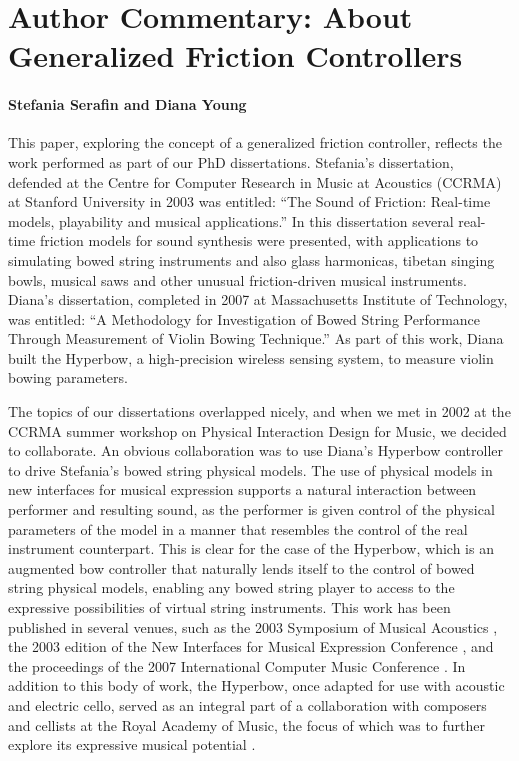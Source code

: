 \section*{Author Commentary: About Generalized Friction Controllers}

\paragraph{Stefania Serafin and Diana Young}

This paper, exploring the concept of a generalized friction controller, reflects the work performed as part of our PhD dissertations. Stefania's dissertation, defended at the Centre for Computer Research in Music at Acoustics (CCRMA) at Stanford University in 2003 was entitled: ``The Sound of Friction: Real-time models, playability and musical applications.''  In this dissertation several real-time friction models for sound synthesis were presented, with applications to simulating bowed string instruments and also glass harmonicas, tibetan singing bowls, musical saws and other unusual friction-driven musical instruments. Diana's dissertation, completed in 2007 at Massachusetts Institute of Technology, was entitled: ``A Methodology for Investigation of Bowed String Performance Through Measurement of Violin Bowing Technique.'' As part of this work, Diana built the Hyperbow, a high-precision wireless sensing system, to measure violin bowing parameters.

The topics of our dissertations overlapped nicely, and when we met in 2002 at the CCRMA summer workshop on Physical Interaction Design for Music, we decided to collaborate. An obvious collaboration was to use Diana's Hyperbow controller to drive Stefania's bowed string physical models. The use of physical models in new interfaces for musical expression supports a natural interaction between performer and resulting sound, as the performer is given control of the physical parameters of the model in a manner that resembles the control of the real instrument counterpart. This is clear for the case of the Hyperbow, which is an augmented bow controller that naturally lends itself to the control of bowed string physical models, enabling any bowed string player to access to the expressive possibilities of virtual string instruments. This work has been published in several venues, such as the 2003 Symposium of Musical Acoustics \cite{Serafin:2003}, the 2003 edition of the New Interfaces for Musical Expression Conference \cite{Young:2003b}, and  the proceedings of the 2007 International Computer Music Conference \cite{Young:2007}. In addition to this body of work, the Hyperbow, once adapted for use with acoustic and electric cello, served as an integral part of a collaboration with composers and cellists at the Royal  Academy of Music, the focus of which was to further explore its expressive musical potential \cite{Young:2006}.  

